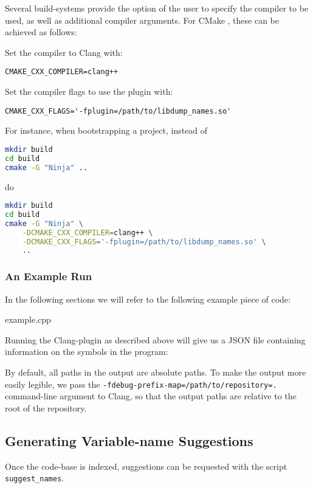 Several build-systems provide the option of the user to specify the compiler to
be used, as well as additional compiler arguments. For CMake \cite{cmake}, these
can be achieved as follows:

Set the compiler to Clang with:
\begin{lstlisting}[caption={CMake Compiler Setting}]
CMAKE_CXX_COMPILER=clang++
\end{lstlisting}

Set the compiler flags to use the plugin with:
\begin{lstlisting}[caption={CMake Compiler Arguments}]
CMAKE_CXX_FLAGS='-fplugin=/path/to/libdump_names.so'
\end{lstlisting}

For instance, when bootstrapping a project, instead of
\begin{lstlisting}[caption={CMake Invocation without the Plugin}, language=bash]
mkdir build
cd build
cmake -G "Ninja" ..
\end{lstlisting}
do
\begin{lstlisting}[caption={CMake Invocation with the Plugin}, language=bash]
mkdir build
cd build
cmake -G "Ninja" \
	-DCMAKE_CXX_COMPILER=clang++ \
	-DCMAKE_CXX_FLAGS='-fplugin=/path/to/libdump_names.so' \
	..
\end{lstlisting}

\subsubsection{An Example Run}
In the following sections we will refer to the following example piece of \CC{}
code:


		{example.cpp}

Running the Clang-plugin as described above will give us a JSON file containing
information on the symbols in the program:



By default, all paths in the output are absolute paths. To make the output more
easily legible, we pass the \lstinline|-fdebug-prefix-map=/path/to/repository=.|
command-line argument to Clang, so that the output paths are relative to the
root of the repository.

\subsection{Generating Variable-name Suggestions}
Once the code-base is indexed, suggestions can be requested with the script
\lstinline|suggest_names|.

